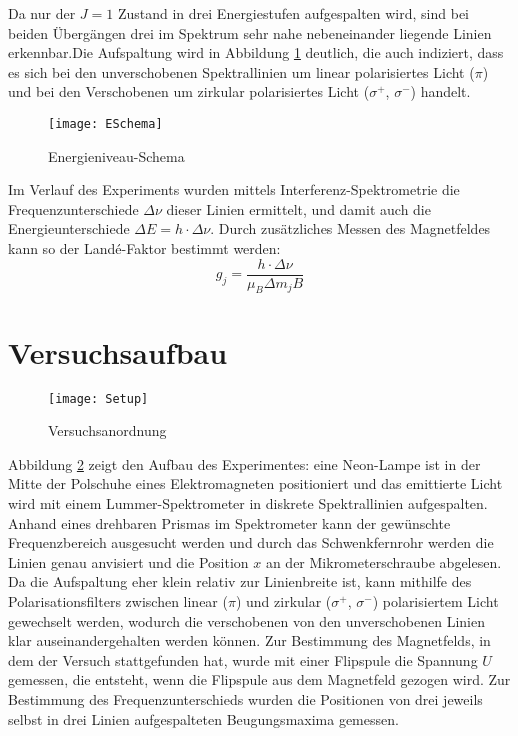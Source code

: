 \documentclass[a4paper,parskip,11pt, DIV12]{scrreprt}
\begin{document}
		Da nur der $J = 1$ Zustand in drei Energiestufen aufgespalten wird, sind bei beiden Übergängen drei im Spektrum sehr nahe nebeneinander liegende Linien erkennbar.Die Aufspaltung wird in Abbildung \ref{Abb:ESchema} deutlich, die auch indiziert, dass es sich bei den unverschobenen Spektrallinien um linear polarisiertes Licht ($\pi$) und bei den Verschobenen um zirkular polarisiertes Licht ($\sigma^+$, $\sigma^-$) handelt.
	\begin{figure}[H]
\centering
\texttt{[image: ESchema]}
\caption[ESchema]{Energieniveau-Schema}
\label{Abb:ESchema}
\end{figure}
	 Im Verlauf des Experiments wurden mittels Interferenz-Spektrometrie die Frequenzunterschiede $\Delta \nu$  dieser Linien ermittelt, und damit auch die Energieunterschiede $\Delta E = h \cdot \Delta \nu$. Durch zusätzliches Messen des Magnetfeldes kann so der Landé-Faktor bestimmt werden:
	\begin{equation}
	\label{Landé-Faktor}
	g_j = \frac{h \cdot \Delta \nu}{\mu_B \Delta m_j B}
	\end{equation}
	
	
	\section{Versuchsaufbau}
	\begin{figure}[H]
\centering
\texttt{[image: Setup]}
\caption[Setup]{Versuchsanordnung}
\label{Abb:Setup}
\end{figure}
	Abbildung \ref{Abb:Setup} zeigt den Aufbau des Experimentes: eine Neon-Lampe ist in der Mitte der Polschuhe eines Elektromagneten positioniert und das emittierte Licht wird mit einem Lummer-Spektrometer in diskrete Spektrallinien aufgespalten. Anhand eines drehbaren Prismas im Spektrometer kann der gewünschte Frequenzbereich ausgesucht werden und durch das Schwenkfernrohr werden die Linien genau anvisiert und die Position $x$ an der Mikrometerschraube abgelesen. Da die Aufspaltung eher klein relativ zur Linienbreite ist, kann mithilfe des Polarisationsfilters zwischen linear ($\pi$) und zirkular ($\sigma^+$, $\sigma^-$) polarisiertem Licht gewechselt werden, wodurch die verschobenen von den unverschobenen Linien klar auseinandergehalten werden können. Zur Bestimmung des Magnetfelds, in dem der Versuch stattgefunden hat, wurde mit einer Flipspule die Spannung $U$ gemessen, die entsteht, wenn die Flipspule aus dem Magnetfeld gezogen wird. Zur Bestimmung des Frequenzunterschieds wurden die Positionen von drei jeweils selbst in drei Linien aufgespalteten Beugungsmaxima gemessen.
	
\end{document}
